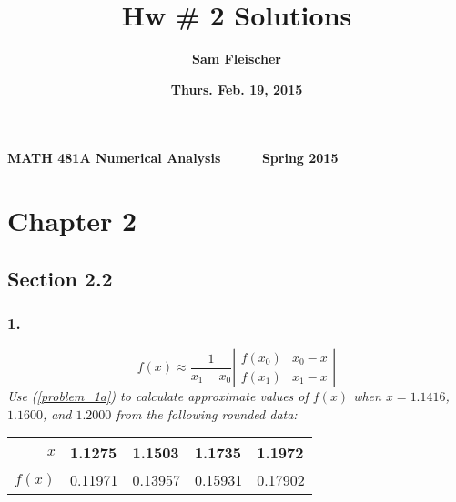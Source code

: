 \documentclass[12pt]{article}
\begin{document}
{\bf MATH 481A \hfill Numerical Analysis \ \ \ \ \ \hfill Spring 2015}

\title{\bf Hw \# 2 Solutions}
\author{\bf Sam Fleischer}
\date{\bf Thurs. Feb. 19, 2015}

{\let\newpage\relax\maketitle}
\maketitle
\tableofcontents
\pagebreak

\section*{Chapter 2}

\subsection*{Section 2.2}

\subsubsection*{1.}

\begin{equation}
\label{problem_1a}
f(x) \approx \frac{1}{x_1 - x_0}\left|\begin{array}{cc}
	f(x_0) & x_0 - x \\
	f(x_1) & x_1 - x
	\end{array}\right|
\end{equation}
{\it Use (\ref{problem_1a}) to calculate approximate values of $f(x)$ when $x = 1.1416$, $1.1600$, and $1.2000$ from the following rounded data:}
\begin{table}[H]
    \centering
    \begin{tabular}{r|llll}
    $x$ & 1.1275 & 1.1503 & 1.1735 & 1.1972 \\  \hline
    $f(x)$ & 0.11971 & 0.13957 & 0.15931 & 0.17902
    \end{tabular}
\end{table}
\end{document}
